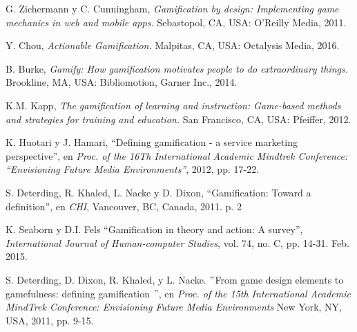 

\begin{thebibliography}{9}

        G. Zichermann y C. Cunningham,
        {\it Gamification by design: Implementing game mechanics in web and mobile apps.}
        Sebastopol, CA, USA: O'Reilly Media, 2011.

        Y. Chou,
        {\it Actionable Gamification.}
        Malpitas, CA, USA: Octalysis Media, 2016.
        
        B. Burke,
        {\it Gamify: How gamification motivates people to do extraordinary things.}
        Brookline, MA, USA: Bibliomotion, Garner Inc., 2014.
        
        K.M. Kapp,
        {\it The gamification of learning and instruction: Game-based methods and strategies for training and education.}
        San Francisco, CA, USA: Pfeiffer, 2012.
        
        K. Huotari y J. Hamari,
        ``Defining gamification - a service marketing perspective'', en
        {\it Proc. of the 16Th International Academic Mindtrek Conference: ``Envisioning Future Media Environments''},
        2012, pp. 17-22.
    
        S. Deterding, R. Khaled, L. Nacke y D. Dixon,
        ``Gamification: Toward a definition'',  en
        {\it CHI}, Vancouver, BC, Canada, 2011. p. 2
        
        K. Seaborn y D.I. Fels
        ``Gamification in theory and action: A survey'',
        {\it International Journal of Human-computer Studies}, vol. 74, no. C, pp. 14-31. Feb. 2015.
        
        S. Deterding, D. Dixon, R. Khaled, y L. Nacke.
        $"$From game design elements to gamefulness: defining gamification $"$, en {\it Proc. of the 15th
        International Academic MindTrek Conference: Envisioning Future Media Environments} New York, NY, USA, 2011, pp. 9-15. 
        

\end{thebibliography}
